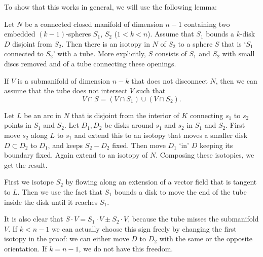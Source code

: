 To show that this works in general, we will use the following lemma:
\begin{lemma}
    Let $N$ be a connected closed manifold of dimension $n-1$ containing two embedded $(k-1)$-spheres $ S_1$, $S_2$ ($1 < k < n$).
    Assume that $S_1$ bounds a $k$-disk $D$  disjoint from $ S_2$. Then there is an isotopy in $N$ of  $ S_2$ to a sphere $S$ that is `$S_1$ connected to $ S_2$' with a tube.
    More explicitly, $S$ consists of $S_1$ and $ S_2$ with small discs removed and of a tube connecting these openings.

    If $V$ is a submanifold of dimension $n-k$ that does not disconnect $N$,  then we can assume that the tube does not intersect $V$ such that
     \[
         V \cap S = (V \cap S_1) \cup (V \cap S_2)
    .\] 
\end{lemma}
\begin{figure}[H]
    \centering
\end{figure}
\begin{myproof}
    Let $L$ be an arc in $N$ that is disjoint from  the interior of $K$ connecting  $s_1$ to $s_2$ points in $S_1$ and $S_2$.
    Let $D_1, D_2$ be disks around $s_1$ and $ s_2$ in $ S_1$ and $S_2$.
    First move $s_2$ along $L$ to  $ s_1$ and extend this to an isotopy that moves a smaller disk $D \subset D_2$ to $D_1$, and keeps $ S_2 - D_2$ fixed.
    Then move $D_1$ `in' $D$ keeping its boundary fixed. Again extend to an isotopy of $N$.
    Composing these isotopies, we get the result.
    \begin{marginfigure}
        \centering
        \caption{
            First we isotope $S_2$ by flowing along an extension of a vector field that is tangent to $L$.
            Then we use the fact that  $S_1$ bounds a disk to move the end of the tube inside the disk until it reaches $S_1$.
        }
        \label{fig:lemma-sphere-connect-with-tube-proof}
    \end{marginfigure}
\end{myproof}

\begin{remark}
    It is also clear that $S\cdot V = S_1\cdot V \pm S_2 \cdot V$, because the tube misses the submanifold $V$.
    If $k < n-1$ we can actually choose this sign freely by changing the first isotopy in the proof: we can either move $D$ to $ D_2$ with the same or the opposite orientation. If $k = n-1$, we do not have this freedom.
\end{remark}

